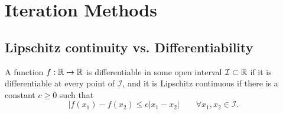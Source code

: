 \renewcommand{\chaptername}{Assignment}
\chapter{Iteration Methods}


\section{Lipschitz continuity vs. Differentiability}
A function \(f:\mathbb{R}\to\mathbb{R}\) is differentiable in some open interval \(\mathcal{I}\subset\mathbb{R}\) if it is differentiable at every point of \(\mathcal{I}\), and it is Lipschitz continuous if there is a constant \(c\geq0\) such that
\[ |f(x_1)-f(x_2)\leq c|x_1-x_2| \qquad \forall x_1,x_2\in\mathcal{I}. \]
